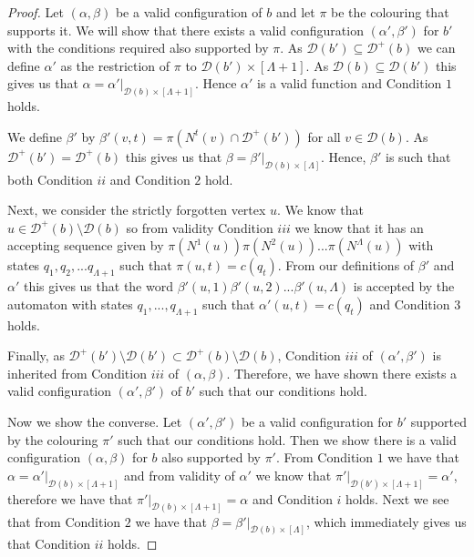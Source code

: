 \documentclass[runningheads]{llncs}
\begin{document}
\begin{proof}
    Let $(\alpha,\beta)$ be a valid configuration of $b$ and let $\pi$ be the colouring that supports it. We will show that there exists a valid configuration $(\alpha',\beta')$ for $b'$ with the conditions required also supported by $\pi$.
    As $\mathcal{D}(b') \subseteq \mathcal{D}^+(b)$ we can define $\alpha'$ as the restriction of $\pi$ to $\mathcal{D}(b') \times [\Lambda+1]$. As $\mathcal{D}(b) \subseteq \mathcal{D}(b')$ this gives us that $\alpha=\alpha'|_{\mathcal{D}(b) \times [\Lambda+1]}$. Hence $\alpha'$ is a valid function and Condition $1$ holds.

    We define $\beta'$ by $\beta'(v,t)=\pi(N^t(v)\cap\mathcal{D}^+(b'))$ for all $v \in \mathcal{D}(b)$.
    As $\mathcal{D}^+(b')=\mathcal{D}^+(b)$ this gives us that $\beta=\beta'|_{\mathcal{D}(b) \times [\Lambda]}$. Hence, $\beta'$ is such that both Condition $ii$ and Condition $2$ hold.

    Next, we consider the strictly forgotten vertex $u$. We know that $u \in \mathcal{D}^+(b) \setminus \mathcal{D}(b)$ so from validity Condition $iii$ we know that it has an accepting sequence given by $ \pi(N^1(u))\pi(N^2(u))...\pi(N^\Lambda(u))$ with states $q_1,q_2,...q_{\Lambda+1}$ such that $\pi(u,t)=c(q_t)$. From our definitions of $\beta'$ and $\alpha'$ this gives us that the word $\beta'(u,1)\beta'(u,2)...\beta'(u,\Lambda)$ is accepted by the automaton with states $q_1,...,q_{\Lambda+1}$ such that $\alpha'(u,t)=c(q_t)$ and Condition $3$ holds.
    
Finally, as $\mathcal{D}^+(b')\setminus\mathcal{D}(b') \subset \mathcal{D}^+(b)\setminus\mathcal{D}(b)$,  Condition $iii$ of $(\alpha',\beta')$ is inherited from Condition $iii$ of $(\alpha,\beta)$. Therefore, we have shown there exists a valid configuration $(\alpha',\beta')$ of $b'$ such that our conditions hold.

 Now we show the converse. Let $(\alpha',\beta')$ be a valid configuration for $b'$ supported by the colouring $\pi'$ such that our conditions hold. Then we show there is a valid configuration $(\alpha,\beta)$ for $b$ also supported by $\pi'$.
    From Condition $1$ we have that $\alpha=\alpha'|_{\mathcal{D}(b) \times [\Lambda+1]}$ and from validity of $\alpha'$ we know that $\pi'|_{\mathcal{D}(b') \times [\Lambda+1]}=\alpha'$, therefore we have that $\pi'|_{\mathcal{D}(b) \times [\Lambda+1]}=\alpha$ and Condition $i$ holds.
Next we see that from Condition $2$ we have that $\beta=\beta'|_{\mathcal{D}(b) \times [\Lambda]}$, which immediately gives us that Condition $ii$ holds.


\end{proof}
\end{document}
